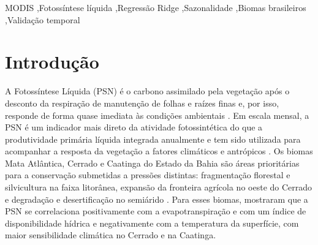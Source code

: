 \documentclass[a4paper,fleqn]{cas-sc}
\begin{document}
\begin{keywords}
MODIS \sep Fotossíntese líquida \sep Regressão Ridge \sep Sazonalidade \sep Biomas brasileiros \sep Validação temporal
\end{keywords}

\maketitle

\section{Introdução}\label{sec:intro}

A Fotossíntese Líquida (PSN) é o carbono assimilado pela vegetação após o desconto da respiração de manutenção de folhas e raízes finas e, por isso, responde de forma quase imediata às condições ambientais \citep{running2004,running2021gpp}. Em escala mensal, a PSN é um indicador mais direto da atividade fotossintética do que a produtividade primária líquida integrada anualmente e tem sido utilizada para acompanhar a resposta da vegetação a fatores climáticos e antrópicos \citep{nemani2003,benfica2023}. Os biomas Mata Atlântica, Cerrado e Caatinga do Estado da Bahia são áreas prioritárias para a conservação submetidas a pressões distintas: fragmentação florestal e silvicultura na faixa litorânea, expansão da fronteira agrícola no oeste do Cerrado e degradação e desertificação no semiárido \citep{ribeiro2009,lima2020,marengo2018,mapbiomas2025}. Para esses biomas, \citet{benfica2022,benfica2023} mostraram que a PSN se correlaciona positivamente com a evapotranspiração e com um índice de disponibilidade hídrica e negativamente com a temperatura da superfície, com maior sensibilidade climática no Cerrado e na Caatinga.
\end{document}
